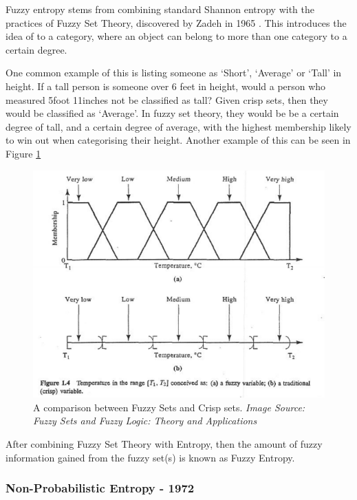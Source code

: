 Fuzzy entropy stems from combining standard Shannon entropy with the practices of Fuzzy Set Theory, discovered by Zadeh in 1965 \cite{Zadeh_1965}. This introduces the idea of  to a category, where an object can belong to more than one category to a certain degree.

One common example of this is listing someone as `Short', `Average' or `Tall' in height. If a tall person is someone over 6 feet in height, would a person who measured 5foot 11inches not be classified as tall? Given crisp sets, then they would be classified as `Average'. In fuzzy set theory, they would be be a certain degree of tall, and a certain degree of average, with the highest membership likely to win out when categorising their height. Another example of this can be seen in Figure \ref{fig:fuzzy-sets}

\begin{figure}[H]
  \center
  \includegraphics[scale=0.5]{Chapter1/lit-review-img/fuzzy-sets.png}
  \caption{A comparison between Fuzzy Sets and Crisp sets. \textit{Image Source: Fuzzy Sets and Fuzzy Logic: Theory and Applications \cite{GEORGE_J_BO_2008}}}
  \label{fig:fuzzy-sets}
\end{figure}

After combining Fuzzy Set Theory with Entropy, then the amount of fuzzy information gained from the fuzzy set(s) is known as Fuzzy Entropy.

\subsubsection{Non-Probabilistic Entropy - 1972}

